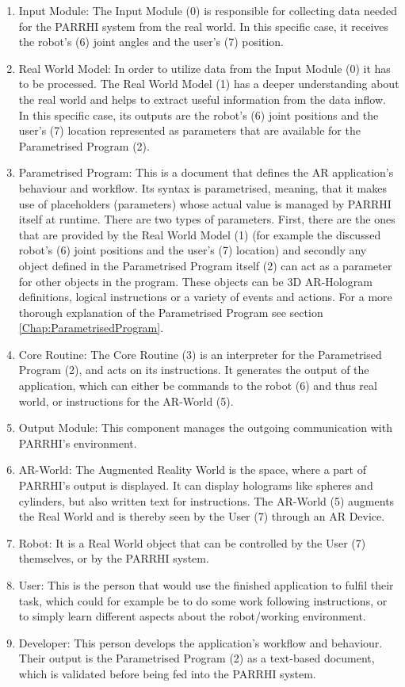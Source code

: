 \begin{enumerate}
	\addtocounter{enumi}{-1}
	\setlength\itemsep{-1em}
	\item Input Module: The Input Module (0) is responsible for collecting data needed for the PARRHI system from the real world. In this specific case, it  receives the robot's (6) joint angles and the user's (7) position.
	\item Real World Model: In order to utilize data from the Input Module (0) it has to be processed. The Real World Model (1) has a deeper understanding about the real world and helps to extract useful information from the data inflow. In this specific case, its outputs are the robot's (6) joint positions and the user's (7) location represented as parameters that are available for the Parametrised Program (2).
	\item Parametrised Program: This is a document that defines the AR application's behaviour and workflow. Its syntax is parametrised, meaning, that it makes use of placeholders (parameters) whose actual value is managed by PARRHI itself at runtime. There are two types of parameters. First, there are the ones that are provided by the Real World Model (1) (for example the discussed robot's (6) joint positions and the user's (7) location) and secondly any object defined in the Parametrised Program itself (2) can act as a parameter for other objects in the program. These objects can be 3D AR-Hologram definitions, logical instructions or a variety of events and actions. For a more thorough explanation of the Parametrised Program see section \ref{Chap:ParametrisedProgram}.
	\item Core Routine: The Core Routine (3) is an interpreter for the Parametrised Program (2), and acts on its instructions. It generates the output of the application, which can either be commands to the robot (6) and thus real world, or instructions for the AR-World (5).
	\item Output Module: This component manages the outgoing communication with PARRHI's environment. 
	\item AR-World: The Augmented Reality World is the space, where a part of PARRHI's output is displayed. It can display holograms like spheres and cylinders, but also written text for instructions. The AR-World (5) augments the Real World and is thereby seen by the User (7) through an AR Device.
	\item Robot: It is a Real World object that can be controlled by the User (7) themselves, or by the PARRHI system.
	\item User: This is the person that would use the finished application to fulfil their task, which could for example be to do some work following instructions, or to simply learn different aspects about the robot/working environment.
	\item Developer: This person develops the application's workflow and behaviour. Their output is the Parametrised Program (2) as a text-based document, which is validated before being fed into the PARRHI system.
\end{enumerate}

